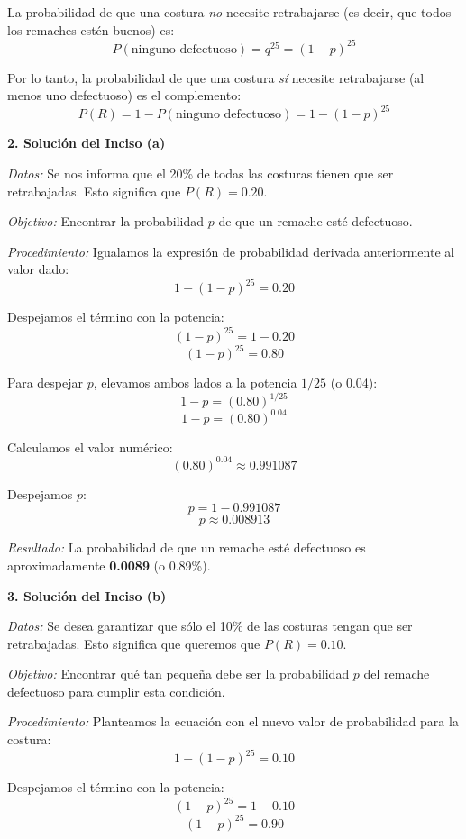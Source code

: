 \documentclass[a4paper]{article}
\begin{document}
La probabilidad de que una costura \textit{no} necesite retrabajarse (es decir, que todos los remaches estén buenos) es:
$$ P(\text{ninguno defectuoso}) = q^{25} = (1 - p)^{25} $$

Por lo tanto, la probabilidad de que una costura \textit{sí} necesite retrabajarse (al menos uno defectuoso) es el complemento:
$$ P(R) = 1 - P(\text{ninguno defectuoso}) = 1 - (1 - p)^{25} $$

\vspace{0.3cm}

\textbf{2. Solución del Inciso (a)}

\textit{Datos:} Se nos informa que el 20\% de todas las costuras tienen que ser retrabajadas.
Esto significa que $P(R) = 0.20$.

\textit{Objetivo:} Encontrar la probabilidad $p$ de que un remache esté defectuoso.

\textit{Procedimiento:}
Igualamos la expresión de probabilidad derivada anteriormente al valor dado:
$$ 1 - (1 - p)^{25} = 0.20 $$

Despejamos el término con la potencia:
$$ (1 - p)^{25} = 1 - 0.20 $$
$$ (1 - p)^{25} = 0.80 $$

Para despejar $p$, elevamos ambos lados a la potencia $1/25$ (o 0.04):
$$ 1 - p = (0.80)^{1/25} $$
$$ 1 - p = (0.80)^{0.04} $$

Calculamos el valor numérico:
$$ (0.80)^{0.04} \approx 0.991087 $$

Despejamos $p$:
$$ p = 1 - 0.991087 $$
$$ p \approx 0.008913 $$

\textit{Resultado:} La probabilidad de que un remache esté defectuoso es aproximadamente \textbf{0.0089} (o 0.89\%).

\vspace{0.3cm}

\textbf{3. Solución del Inciso (b)}

\textit{Datos:} Se desea garantizar que sólo el 10\% de las costuras tengan que ser retrabajadas.
Esto significa que queremos que $P(R) = 0.10$.

\textit{Objetivo:} Encontrar qué tan pequeña debe ser la probabilidad $p$ del remache defectuoso para cumplir esta condición.

\textit{Procedimiento:}
Planteamos la ecuación con el nuevo valor de probabilidad para la costura:
$$ 1 - (1 - p)^{25} = 0.10 $$

Despejamos el término con la potencia:
$$ (1 - p)^{25} = 1 - 0.10 $$
$$ (1 - p)^{25} = 0.90 $$
\end{document}
